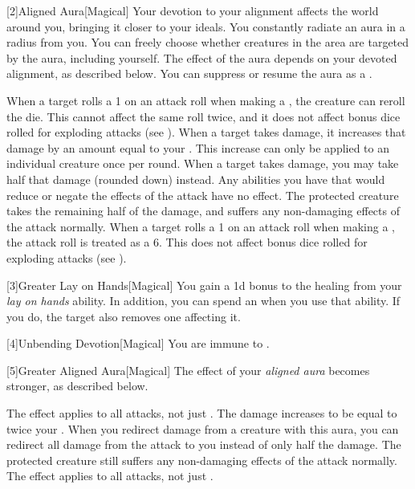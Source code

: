         [2]{Aligned Aura}[Magical]
        Your devotion to your alignment affects the world around you, bringing it closer to your ideals.
        You constantly radiate an aura in a \areamed radius  from you.
        You can freely choose whether creatures in the area are targeted by the aura, including yourself.
        The effect of the aura depends on your devoted alignment, as described below.
        You can suppress or resume the aura as a .

         When a target rolls a 1 on an attack roll when making a , the creature can reroll the die.
        This cannot affect the same roll twice, and it does not affect bonus dice rolled for exploding attacks (see ).
         When a target takes damage, it increases that damage by an amount equal to your .
        This increase can only be applied to an individual creature once per round.
         When a target takes damage, you may take half that damage (rounded down) instead.
        Any abilities you have that would reduce or negate the effects of the attack have no effect.
        The protected creature takes the remaining half of the damage, and suffers any non-damaging effects of the attack normally.
         When a target rolls a 1 on an attack roll when making a , the attack roll is treated as a 6.
        This does not affect bonus dice rolled for exploding attacks (see ).

        [3]{Greater Lay on Hands}[Magical]
        You gain a \plus1d bonus to the healing from your \textit{lay on hands} ability.
        In addition, you can spend an  when you use that ability.
        If you do, the target also removes one  affecting it.

        [4]{Unbending Devotion}[Magical]
        You are immune to  .

        [5]{Greater Aligned Aura}[Magical]
        The effect of your \textit{aligned aura} becomes stronger, as described below.

         The effect applies to all attacks, not just .
         The damage increases to be equal to twice your .
         When you redirect damage from a creature with this aura, you can redirect all damage from the attack to you instead of only half the damage.
        The protected creature still suffers any non-damaging effects of the attack normally.
         The effect applies to all attacks, not just .

